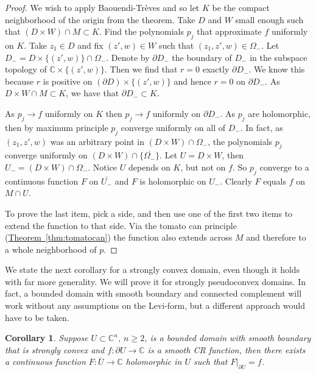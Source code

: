 \documentclass[12pt,openany]{book}
\newcommand{\C}{{\mathbb{C}}}
\theoremstyle{plain}
\newtheorem{cor}[thm]{Corollary}
\theoremstyle{remark}
\theoremstyle{definition}
\theoremstyle{exercise}
\theoremstyle{example}
\newcommand{\thmref}[1]{\hyperref[#1]{Theorem~\ref*{#1}}}
\begin{document}
\begin{proof}
We wish to apply
Baouendi-Tr{\`e}ves and so let $K$ be the compact neighborhood of the
origin from the theorem.  Take $D$ and $W$ small enough such
that $(D \times W) \cap M \subset K$.
Find the polynomials $p_j$ that approximate $f$ uniformly on $K$.
Take $z_1 \in D$ and fix $(z',w) \in W$ such that
$(z_1,z',w) \in \Omega_-$.
Let
$D_- = D \times \{ (z',w) \} \cap \Omega_-$.
Denote by $\partial D_-$ the boundary of $D_-$ in the subspace topology
of $\C \times \{ (z',w) \}$.
Then we find that $r=0$ exactly $\partial D_-$.
We know this because $r$ is positive on $(\partial D) \times \{ (z',w) \}$
and hence $r=0$ on $\partial D_-$.
As $D \times W \cap M \subset K$, we have that $\partial D_- \subset K$.

\begin{center}

\end{center}

As $p_j \to f$ uniformly on $K$ then $p_j \to f$ uniformly on
$\partial D_-$.  As  $p_j$ are holomorphic, then by maximum
principle $p_j$ converge uniformly on all of $D_-$.  In fact, as $(z_1,z',w)$ was
an arbitrary point in $(D \times W) \cap \Omega_-$,
the polynomials $p_j$ converge uniformly on $(D \times W) \cap \{
\overline{\Omega_-} \}$.
%
Let $U = D \times W$, then $U_- = (D \times W) \cap \Omega_-$.  Notice 
$U$ depends on $K$, but not on $f$.
So $p_j$ converge to a continuous function $F$ on $\overline{U_-}$ and $F$
is holomorphic on
$U_-$.  Clearly $F$ equals $f$ on $M \cap U$.

To prove the last item, pick a side, and then use one of the first two
items to extend the function to that side.  Via the tomato can
principle (\thmref{thm:tomatocan}) the function also extends across $M$ and
therefore to a whole neighborhood of $p$.
\end{proof}

We state the next corollary for a strongly convex domain, even though it
holds with far more generality.  We will prove it for strongly pseudoconvex
domains.  In fact, a bounded domain with smooth
boundary and connected complement
will work without any assumptions on the Levi-form, but 
a different approach would have to be taken.

\begin{cor}
Suppose $U \subset \C^n$, $n \geq 2$, is a bounded domain with smooth boundary that is
strongly convex 
and $f \colon \partial U \to \C$ is a smooth CR function, then
there exists a continuous function $F \colon \overline{U} \to \C$
holomorphic in $U$
such that $F|_{\partial U} = f$.
\end{cor}
\end{document}
